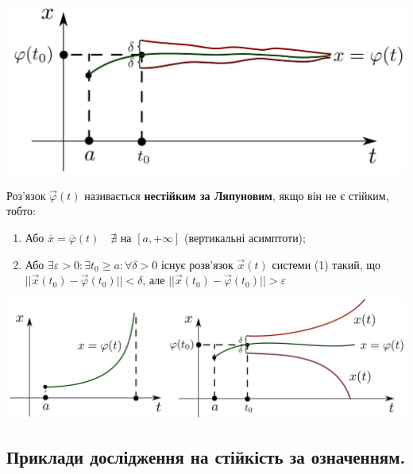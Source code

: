 \documentclass[14pt,a4paper]{scrartcl}
\theoremstyle{definition}
\theoremstyle{remark}
\theoremstyle{definition}
\theoremstyle{definition}
\begin{document}
\begin{center} \includegraphics[scale=0.35]{assets/lect2.jpg} \end{center}

Роз'язок $\vec{\varphi}(t)$ називається \textbf{нестійким за Ляпуновим}, якщо він не є стійким, тобто:
\ed

\begin{enumerate}
  \item Або $\overline{x} = \overline{\varphi}(t) \quad \nexists$ на  $[a, +\infty]$ (вертикальні асимптоти);
  \item Або $\exists \varepsilon > 0 : \exists t_0 \geq a :  \forall \delta > 0$ існує розв'язок $\vec{x}(t)$ системи (1) такий, що $||\vec{x}(t_0) - \vec{\varphi}(t_0)|| < \delta$, але $||\vec{x}(t_0) - \vec{\varphi}(t_0)|| > \varepsilon$
\end{enumerate}

\begin{center} \includegraphics[scale=1.25]{assets/lect3+4.jpg} \end{center}

\subsection{Приклади дослідження на стійкість за означенням.}
\end{document}
